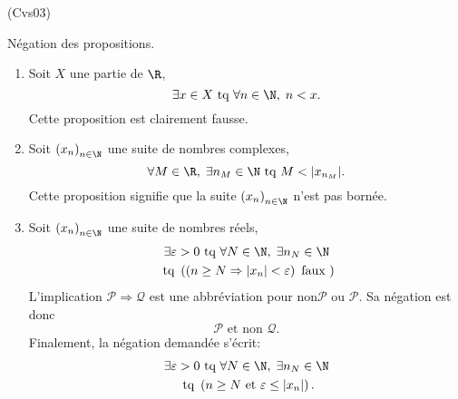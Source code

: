 \begin{tiny}(Cvs03)\end{tiny} Négation des propositions.
\begin{enumerate}
  \item Soit $X$ une partie de $\R$,
\begin{displaymath}
  \exists x \in X \text{ tq } \forall n\in \N,\; n < x.
\end{displaymath}
Cette proposition est clairement fausse.

  \item Soit $\left( x_n\right)_{n\in \N}$ une suite de nombres complexes,
\begin{displaymath}
  \forall M\in \R, \; \exists n_M \in \N \text{ tq } M < |x_{n_M}|.
\end{displaymath}
Cette proposition signifie que la suite $\left( x_n\right)_{n\in \N}$ n'est pas bornée.

  \item Soit $\left( x_n\right)_{n\in \N}$ une suite de nombres réels,
\begin{multline*}
  \exists \varepsilon >0 \text{ tq } \forall N\in \N, \; \exists n_N \in \N \\
  \text{ tq } \left( \left( n\geq N \Rightarrow |x_n| < \varepsilon\right) \text{ faux }\right) 
\end{multline*}
  L'implication $\mathcal{P} \Rightarrow \mathcal{Q}$ est une abbréviation pour $\text{non}\mathcal{P} \text{ ou } \mathcal{P}$. Sa négation est donc
\[
  \mathcal{P} \text{ et non } \mathcal{Q}.
\]
Finalement, la négation demandée s'écrit:
\begin{multline*}
  \exists \varepsilon >0 \text{ tq } \forall N\in \N, \; \exists n_N \in \N \\
  \text{ tq } \left( n \geq N  \text{ et } \varepsilon \leq |x_n| \right) .
\end{multline*}

\end{enumerate}
